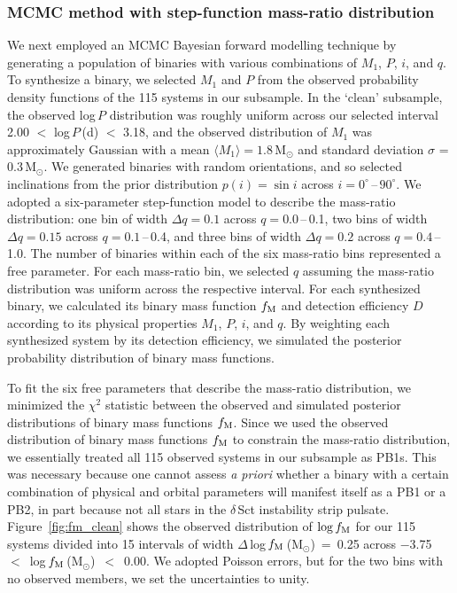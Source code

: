 \documentclass[a4paper,fleqn,usenatbib]{mnras}
\begin{document}
\subsubsection{MCMC method with step-function mass-ratio distribution}
\label{sssec:MCMC_step}

We next employed an MCMC Bayesian forward modelling technique by generating a population of binaries with various combinations of $M_1$, $P$, $i$, and $q$. To synthesize a binary, we selected $M_1$ and $P$ from the observed probability density functions of the 115 systems in our subsample.  In the `clean' subsample, the observed log\,$P$ distribution was roughly uniform across our selected interval 2.00 $<$ log\,$P$\,(d) $<$ 3.18, and the observed distribution of $M_1$ was approximately Gaussian with a mean $\langle M_1 \rangle = 1.8$\,M$_{\odot}$ and standard deviation $\sigma$ = 0.3\,M$_{\odot}$.  We generated binaries with random orientations, and so selected inclinations from the prior distribution $p(i) = \sin i$ across \mbox{$i=0^{\circ}$\,--\,$90^{\circ}$}. We adopted a six-parameter step-function model to describe the mass-ratio distribution: one bin of width $\Delta q = 0.1$ across \mbox{$q = 0.0$\,--\,0.1}, two bins of width $\Delta q = 0.15$ across \mbox{$q = 0.1$\,--\,0.4}, and three bins of width $\Delta q = 0.2$ across \mbox{$q = 0.4$\,--\,1.0}.  The number of binaries within each of the six mass-ratio bins represented a free parameter. For each mass-ratio bin, we selected $q$ assuming the mass-ratio distribution was uniform across the respective interval. For each synthesized binary, we calculated its binary mass function $f_{\rm M}$ and detection efficiency $D$ according to its physical properties $M_1$, $P$, $i$, and $q$.  By weighting each synthesized system by its detection efficiency, we simulated the posterior probability distribution of binary mass functions.

To fit the six free parameters that describe the mass-ratio distribution, we minimized the $\chi^2$ statistic between the observed and simulated posterior distributions of binary mass functions $f_{\rm M}$. Since we used the observed distribution of binary mass functions $f_{\rm M}$ to constrain the mass-ratio distribution, we essentially treated all 115 observed systems in our subsample as PB1s. This was necessary because one cannot assess {\em a priori} whether a binary with a certain combination of physical and orbital parameters will manifest itself as a PB1 or a PB2, in part because not all stars in the $\delta$\,Sct instability strip pulsate. Figure~\ref{fig:fm_clean} shows the observed distribution of $\log f_{\rm M}$ for our 115 systems divided into 15 intervals of width $\Delta$\,log\,$f_{\rm M}$\,(M$_{\odot}$)~=~0.25 across $-$3.75~$<$~log\,$f_{\rm M}$\,(M$_{\odot}$)~$<$~0.00. We adopted Poisson errors, but for the two bins with no observed members, we set the uncertainties to unity. 
\end{document}
